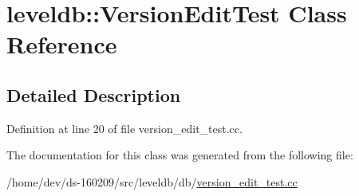 \hypertarget{classleveldb_1_1_version_edit_test}{}\section{leveldb\+:\+:Version\+Edit\+Test Class Reference}
\label{classleveldb_1_1_version_edit_test}


\subsection{Detailed Description}


Definition at line 20 of file version\+\_\+edit\+\_\+test.\+cc.



The documentation for this class was generated from the following file\+:\begin{DoxyCompactItemize}
\item 
/home/dev/ds-\/160209/src/leveldb/db/\hyperlink{version__edit__test_8cc}{version\+\_\+edit\+\_\+test.\+cc}\end{DoxyCompactItemize}
